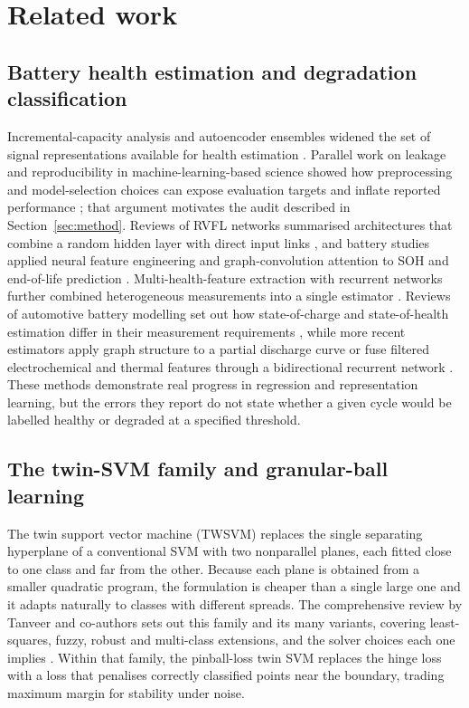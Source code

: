 \documentclass[final,5p,times,twocolumn]{elsarticle}
\begin{document}
\section{Related work}\label{sec:related}
\subsection{Battery health estimation and degradation classification}
Incremental-capacity analysis and autoencoder ensembles widened the set of signal representations available for health estimation \cite{dubarry2022,wu2022}. Parallel work on leakage and reproducibility in machine-learning-based science showed how preprocessing and model-selection choices can expose evaluation targets and inflate reported performance \cite{kapoor2023}; that argument motivates the audit described in Section~\ref{sec:method}. Reviews of RVFL networks summarised architectures that combine a random hidden layer with direct input links \cite{malik2023}, and battery studies applied neural feature engineering and graph-convolution attention to SOH and end-of-life prediction \cite{pepe2023,wei2023}. Multi-health-feature extraction with recurrent networks further combined heterogeneous measurements into a single estimator \cite{peng2023}. Reviews of automotive battery modelling set out how state-of-charge and state-of-health estimation differ in their measurement requirements \cite{dini2024}, while more recent estimators apply graph structure to a partial discharge curve \cite{zhou2024gnn} or fuse filtered electrochemical and thermal features through a bidirectional recurrent network \cite{xia2024fusion}. These methods demonstrate real progress in regression and representation learning, but the errors they report do not state whether a given cycle would be labelled healthy or degraded at a specified threshold.

\subsection{The twin-SVM family and granular-ball learning}\label{sec:twsvm}
The twin support vector machine (TWSVM) replaces the single separating hyperplane of a conventional SVM with two nonparallel planes, each fitted close to one class and far from the other. Because each plane is obtained from a smaller quadratic program, the formulation is cheaper than a single large one and it adapts naturally to classes with different spreads. The comprehensive review by Tanveer and co-authors sets out this family and its many variants, covering least-squares, fuzzy, robust and multi-class extensions, and the solver choices each one implies \cite{tanveer2024}. Within that family, the pinball-loss twin SVM \cite{xu2017twin} replaces the hinge loss with a loss that penalises correctly classified points near the boundary, trading maximum margin for stability under noise.
\end{document}
